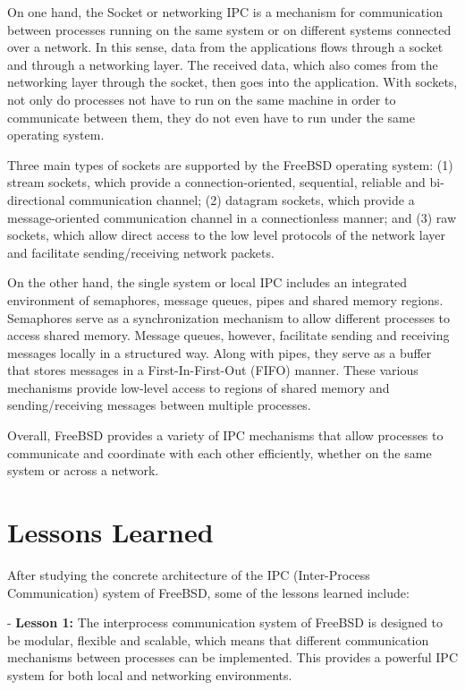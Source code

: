 \documentclass[12pt, dvipsnames, a4paper]{article}
\begin{document}
On one hand, the Socket or networking IPC is a mechanism for communication between processes running on the same system or on different systems connected over a network. In this sense, data from the applications flows through a socket and through a networking layer. The received data, which also comes from the networking layer through the socket, then goes into the application. With sockets, not only do processes not have to run on the same machine in order to communicate between them, they do not even have to run under the same operating system.

Three main types of sockets are supported by the FreeBSD operating system: (1) stream sockets, which provide a connection-oriented, sequential, reliable and bi-directional communication channel; (2) datagram sockets, which provide a message-oriented communication channel in a connectionless manner; and (3) raw sockets, which allow direct access to the low level protocols of the network layer and facilitate sending/receiving network packets.

On the other hand, the single system or local IPC includes an integrated environment of semaphores, message queues, pipes and shared memory regions. Semaphores serve as a synchronization mechanism to allow different processes to access shared memory. Message queues, however, facilitate sending and receiving messages locally in a structured way. Along with pipes, they serve as a buffer that stores messages in a First-In-First-Out (FIFO) manner. These various mechanisms provide low-level access to regions of shared memory and sending/receiving messages between multiple processes.

Overall, FreeBSD provides a variety of IPC mechanisms that allow processes to communicate and coordinate with each other efficiently, whether on the same system or across a network.

\section{Lessons Learned}
After studying the concrete architecture of the IPC (Inter-Process Communication) system of FreeBSD, some of the lessons learned include:

- \textbf{Lesson 1:} The interprocess communication system of FreeBSD is designed to be modular, flexible and scalable, which means that different communication mechanisms between processes can be implemented. This provides a powerful IPC system  for both local and networking environments.
\end{document}
